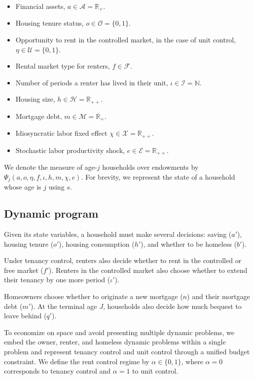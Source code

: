 \documentclass[parskip=full]{article}
\begin{document}
\begin{itemize}
    \item Financial assets, $a\in \mathcal{A}=\mathbb{R}_{+}$.
    \item Housing tenure status, $o \in \mathcal{O}=\{0,1\}$.
    \item Opportunity to rent in the controlled market, in the case of unit control, $\eta \in \mathcal{U}=\{0,1\}$.
    \item Rental market type for renters, $f \in \mathcal{F}$.
    \item Number of periods a renter has lived in their unit, $\iota \in \mathcal{I}=\mathbb{N}$.
    \item Housing size, $h\in \mathcal{H}=\mathbb{R}_{++}$.
    \item Mortgage debt, $m \in \mathcal{M}=\mathbb{R}_{+}$.
    \item Idiosyncratic labor fixed effect $\chi \in \mathcal{X}=\mathbb{R}_{++}$.
    \item Stochastic labor productivity shock, $e \in \mathcal{E} = \mathbb{R}_{++}$.
\end{itemize}
 
\noindent We denote the measure of age-$j$ households over endowments by $\Psi_{j}(a,o,\eta,f,\iota,h,m,\chi,e)$. For brevity, we represent the state of a household whose age is $j$ using $s$.

\subsection{Dynamic program}\label{subsection:household_optimization}
Given its state variables, a household must make several decisions: saving ($a'$), housing tenure ($o'$), housing consumption ($h'$), and whether to be homeless ($b'$). 

Under tenancy control, renters also decide whether to rent in the controlled or free market ($f'$). Renters in the controlled market also choose whether to extend their tenancy by one more period ($\iota'$).

Homeowners choose whether to originate a new mortgage ($n$) and their mortgage debt ($m'$). At the terminal age $J$, households also decide how much bequest to leave behind ($q'$).

To economize on space and avoid presenting multiple dynamic problems, we embed the owner, renter, and homeless dynamic problems within a single problem and represent tenancy control and unit control through a unified budget constraint. We define the rent control regime by $\alpha \in \{0,1\}$, where $\alpha=0$ corresponds to tenancy control and $\alpha=1$ to unit control.
\end{document}
